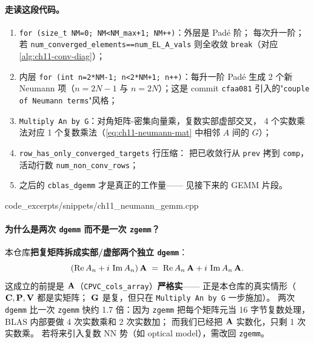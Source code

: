 \paragraph{走读这段代码。}
\begin{enumerate}
  \item \texttt{for (size\_t NM=0; NM<NM\_max+1; NM++)}：外层是 Padé 阶；
        每次升一阶；若 \texttt{num\_converged\_elements==num\_EL\_A\_vals}
        则全收敛 \texttt{break}（对应 \cref{alg:ch11-conv-diag}）；
  \item 内层 \texttt{for (int n=2*NM-1; n<2*NM+1; n++)}：每升一阶 Padé
        生成 2 个新 Neumann 项（\(n=2N-1\) 与 \(n=2N\)）；这是
        commit \texttt{cfaa081} 引入的"\texttt{couple of Neumann terms}"风格；
  \item \texttt{Multiply An by G}：对角矩阵-密集向量乘，复数实部虚部交叉，
        4 个实数乘法对应 1 个复数乘法（\cref{eq:ch11-neumann-mat}
        中相邻 \(A\) 间的 \(G\)）；
  \item \texttt{row\_has\_only\_converged\_targets} 行压缩：
        把已收敛行从 \texttt{prev} 拷到 \texttt{comp}，活动行数
        \texttt{num\_non\_conv\_rows}；
  \item 之后的 \texttt{cblas\_dgemm} 才是真正的工作量——
        见接下来的 GEMM 片段。
\end{enumerate}


  {code_excerpts/snippets/ch11_neumann_gemm.cpp}

\paragraph{为什么是两次 \texttt{dgemm} 而不是一次 \texttt{zgemm}？}
本仓库\textbf{把复矩阵拆成实部/虚部两个独立 \texttt{dgemm}}：
\begin{equation}
\label{eq:ch11-complex-as-real}
(\operatorname{Re} A_n + i\,\operatorname{Im} A_n)\,\mathbf{A}
\;=\;
\operatorname{Re} A_n\,\mathbf{A} + i\,\operatorname{Im} A_n\,\mathbf{A}.
\end{equation}
这成立的前提是 \(\mathbf{A}\)（\texttt{CPVC\_cols\_array}）\textbf{严格实}——
正是本仓库的真实情形（\(\mathbf{C}, \mathbf{P}, \mathbf{V}\) 都是实矩阵；
\(\mathbf{G}\) 是复，但只在 \texttt{Multiply An by G} 一步施加）。
两次 \texttt{dgemm} 比一次 \texttt{zgemm} 快约 1.7 倍：因为 \texttt{zgemm}
把每个矩阵元当 16 字节复数处理，BLAS 内部要做 4 次实数乘和 2 次实数加；
而我们已经把 \(\mathbf{A}\) 实数化，只剩 1 次实数乘。
若将来引入复数 NN 势（如 optical model），需改回 \texttt{zgemm}。

